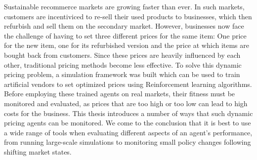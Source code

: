Sustainable recommerce markets are growing faster than ever. In such markets, customers are incentiviced to re-sell their used products to businesses, which then refurbish and sell them on the secondary market. However, businesses now face the challenge of having to set three different prices for the same item: One price for the new item, one for its refurbished version and the price at which items are bought back from customers. Since these prices are heavily influenced by each other, traditional pricing methods become less effective. To solve this dynamic pricing problem, a simulation framework was built which can be used to train artificial vendors to set optimized prices using Reinforcement learning algorithms.
Before employing these trained agents on real markets, their fitness must be monitored and evaluated, as prices that are too high or too low can lead to high costs for the business. This thesis introduces a number of ways that such dynamic pricing agents can be monitored. We come to the conclusion that it is best to use a wide range of tools when evaluating different aspects of an agent's performance, from running large-scale simulations to monitoring small policy changes following shifting market states.